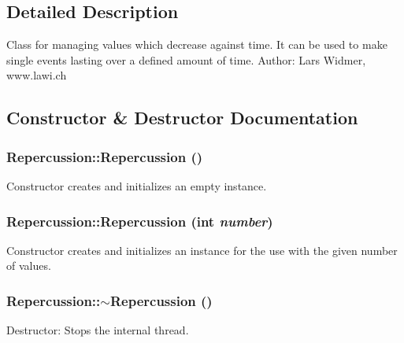 \subsection{Detailed Description}
Class for managing values which decrease against time. It can be used to make single events lasting over a defined amount of time. Author: Lars Widmer, www.lawi.ch 

\subsection{Constructor \& Destructor Documentation}
\hypertarget{classRepercussion_aa00feedc0ca2b0b3f75e799cd4dc4dac}{
\subsubsection[{Repercussion}]{\setlength{\rightskip}{0pt plus 5cm}Repercussion::Repercussion ()}}
\label{classRepercussion_aa00feedc0ca2b0b3f75e799cd4dc4dac}
Constructor creates and initializes an empty instance. \hypertarget{classRepercussion_a5a89f900156f4074a3d569fe48b11f1d}{
\subsubsection[{Repercussion}]{\setlength{\rightskip}{0pt plus 5cm}Repercussion::Repercussion (int {\em number})}}
\label{classRepercussion_a5a89f900156f4074a3d569fe48b11f1d}
Constructor creates and initializes an instance for the use with the given number of values. \hypertarget{classRepercussion_ad32730687e044c8d774dfb995af2f5a8}{
\subsubsection[{$\sim$Repercussion}]{\setlength{\rightskip}{0pt plus 5cm}Repercussion::$\sim$Repercussion ()}}
\label{classRepercussion_ad32730687e044c8d774dfb995af2f5a8}
Destructor: Stops the internal thread. 

